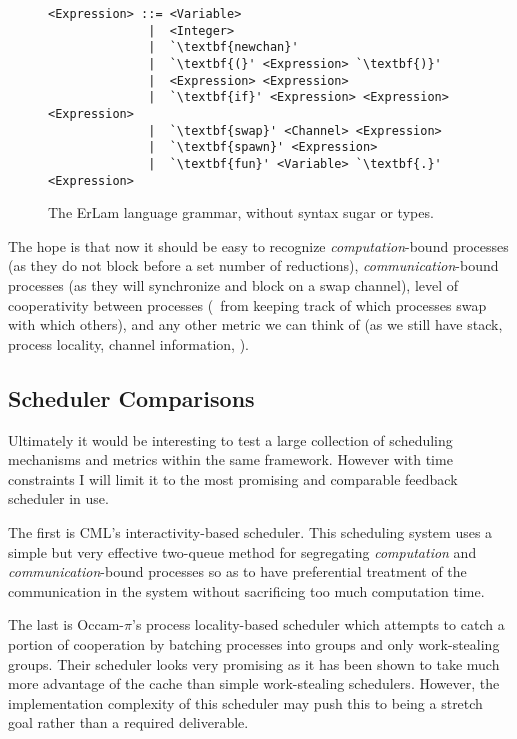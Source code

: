 \begin{figure} %
\centering
\begin{BVerbatim}[commandchars=\\\{\}]
<Expression> ::= <Variable> 
              |  <Integer>
              |  `\textbf{newchan}'
              |  `\textbf{(}' <Expression> `\textbf{)}'
              |  <Expression> <Expression>
              |  `\textbf{if}' <Expression> <Expression> <Expression>
              |  `\textbf{swap}' <Channel> <Expression>
              |  `\textbf{spawn}' <Expression>
              |  `\textbf{fun}' <Variable> `\textbf{.}' <Expression>
\end{BVerbatim}
\caption{The ErLam language grammar, without syntax sugar or types.}
\label{fig:grammer}
\end{figure}

The hope is that now it should be easy to recognize {\em computation}-bound processes (as they do not block
before a set number of reductions), {\em communication}-bound processes (as they will synchronize and block
on a swap channel), level of cooperativity between processes (\ie~from keeping track of which processes swap with
which others), and any other metric we can think of (as we still have stack, process locality, channel
information, \etc).


\subsection{Scheduler Comparisons}
\label{sec:schedwork}

Ultimately it would be interesting to test a large collection of scheduling mechanisms and metrics within the same 
framework. However with time constraints I will limit it to the most promising and comparable feedback scheduler
in use.

The first is CML's interactivity-based scheduler. 
This scheduling system uses a simple but very effective two-queue method for segregating {\em computation} and 
{\em communication}-bound processes so as to have preferential treatment of the communication in the system without
sacrificing too much computation time.

The last is Occam-$\pi$'s process locality-based scheduler which attempts to catch a portion of cooperation by
batching processes into groups and only work-stealing groups. Their scheduler looks very promising as it has 
been shown to take much more advantage of the cache than simple work-stealing schedulers. However, the implementation
complexity of this scheduler may push this to being a stretch goal rather than a required deliverable.

